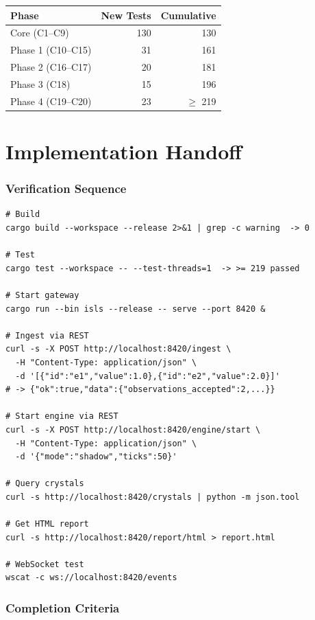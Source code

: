 \documentclass[11pt,a4paper,twoside]{article}
\theoremstyle{definition}
\theoremstyle{plain}
\theoremstyle{remark}
\begin{document}
\begin{tabular}{l r r}
\toprule
\textbf{Phase} & \textbf{New Tests} & \textbf{Cumulative} \\
\midrule
Core (C1--C9) & 130 & 130 \\
Phase 1 (C10--C15) & 31 & 161 \\
Phase 2 (C16--C17) & 20 & 181 \\
Phase 3 (C18) & 15 & 196 \\
Phase 4 (C19--C20) & 23 & $\ge$ 219 \\
\bottomrule
\end{tabular}


\part{Implementation Handoff}\label{part:handoff}

\section{Verification Sequence}

\begin{lstlisting}
# Build
cargo build --workspace --release 2>&1 | grep -c warning  -> 0

# Test
cargo test --workspace -- --test-threads=1  -> >= 219 passed

# Start gateway
cargo run --bin isls --release -- serve --port 8420 &

# Ingest via REST
curl -s -X POST http://localhost:8420/ingest \
  -H "Content-Type: application/json" \
  -d '[{"id":"e1","value":1.0},{"id":"e2","value":2.0}]'
# -> {"ok":true,"data":{"observations_accepted":2,...}}

# Start engine via REST
curl -s -X POST http://localhost:8420/engine/start \
  -H "Content-Type: application/json" \
  -d '{"mode":"shadow","ticks":50}'

# Query crystals
curl -s http://localhost:8420/crystals | python -m json.tool

# Get HTML report
curl -s http://localhost:8420/report/html > report.html

# WebSocket test
wscat -c ws://localhost:8420/events
\end{lstlisting}

\section{Completion Criteria}
\end{document}
